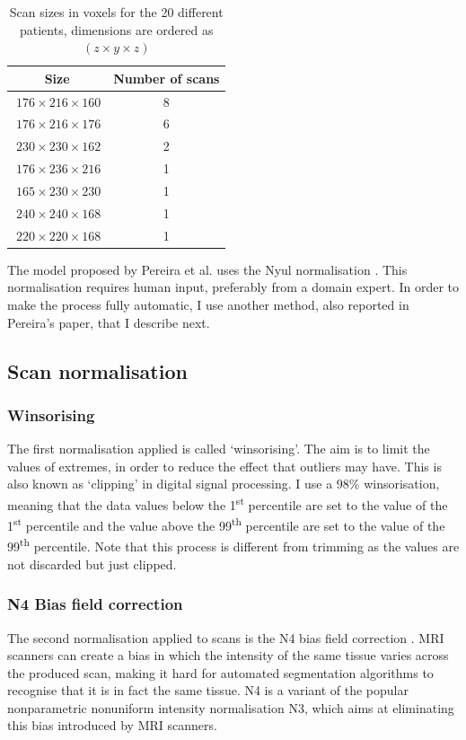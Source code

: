 \documentclass[12pt,a4paper,twoside,openright]{report}
\begin{document}
\begin{table}[h]
\centering	
\begin{tabular}{ c c } 
\textbf{Size} & \textbf{Number of scans}\\
 \hline
 $\ 176 \times 216 \times 160$ & 8 \\ 
 $\ 176 \times 216 \times 176$ & 6 \\ 
 $\ 230 \times 230 \times 162$ & 2 \\ 
 $\ 176 \times 236 \times 216$ & 1 \\ 
 $\ 165 \times 230 \times 230$ & 1 \\ 
 $\ 240 \times 240 \times 168$ & 1 \\ 
 $\ 220 \times 220 \times 168$ & 1 \\ 
\end{tabular}
\caption{Scan sizes in voxels for the 20 different patients, dimensions are ordered as $(z \times y \times z)$}
\label{table:scan_sizes}
\end{table}

The model proposed by Pereira et al. \cite{pereira} uses the Nyul normalisation \cite{nyul}. This normalisation requires human input, preferably from a domain expert. In order to make the process fully automatic, I use another method, also reported in Pereira's paper, that I describe next.

\subsection{Scan normalisation}
\label{section:scan_normalisations}
\subsubsection{Winsorising}
The first normalisation applied is called `winsorising'. The aim is to limit the values of extremes, in order to reduce the effect that outliers may have. This is also known as `clipping' in digital signal processing. I use a 98\% winsorisation, meaning that the data values below the 1\textsuperscript{st} percentile are set to the value of the 1\textsuperscript{st} percentile and the value above the 99\textsuperscript{th} percentile are set to the value of the 99\textsuperscript{th} percentile. Note that this process is different from trimming as the values are not discarded but just clipped.

\subsubsection{N4 Bias field correction}
The second normalisation applied to scans is the N4 bias field correction \cite{n4itk}. MRI scanners can create a bias in which the intensity of the same tissue varies across the produced scan, making it hard for automated segmentation algorithms to recognise that it is in fact the same tissue. N4 is a variant of the popular nonparametric nonuniform intensity normalisation N3, which aims at eliminating this bias introduced by MRI scanners. 
\end{document}
